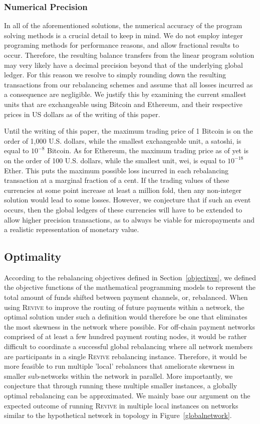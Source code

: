 \documentclass[sigconf]{acmart}
\newcommand{\name}{\textsc{Revive}\xspace}
\begin{document}
\subsubsection{Numerical Precision}

In all of the aforementioned solutions, the numerical accuracy of the program solving methods is a crucial detail to keep in mind. We do not employ integer programing methods for performance reasons, and allow fractional results to occur. Therefore, the resulting balance transfers from the linear program solution may very likely have a decimal precision beyond that of the underlying global ledger.
For this reason we resolve to simply rounding down the resulting transactions from our rebalancing schemes and assume that all losses incurred as a consequence are negligible. We justify this by examining the current smallest units that are exchangeable using Bitcoin and Ethereum, and their respective prices in US dollars as of the writing of this paper.

Until the writing of this paper, the maximum trading price of 1 Bitcoin is on the order of 1,000 U.S. dollars, while the smallest exchangeable unit, a satoshi, is equal to $10^{-8}$ Bitcoin. As for Ethereum, the maximum trading price as of yet is on the order of 100 U.S. dollars, while the smallest unit, wei, is equal to $10^{-18}$ Ether.
This puts the maximum possible loss incurred in each rebalancing transaction at a marginal fraction of a cent. If the trading values of these currencies at some point increase at least a million fold, then any non-integer solution would lead to some losses. However, we conjecture that if such an event occurs, then the global ledgers of these currencies will have to be extended to allow higher precision transactions, as to always be viable for micropayments and a realistic representation of monetary value.

\subsection{Optimality}
\label{optimality}
According to the rebalancing objectives defined in Section~\ref{objectives}, we defined the objective functions of the mathematical programming models to represent the total amount of funds shifted between payment channels, or, rebalanced. When using \name to improve the routing of future payments within a network, the optimal solution under such a definition would therefore be one that eliminates the most skewness in the network where possible.
For off-chain payment networks comprised of at least a few hundred payment routing nodes, it would be rather difficult to coordinate a successful global rebalancing where all network members are participants in a single \name rebalancing instance. Therefore, it would be more feasible to run multiple 'local' rebalances that ameliorate skewness in smaller sub-networks within the network in parallel.
More importantly, we conjecture that through running these multiple smaller instances, a globally optimal rebalancing can be approximated. We mainly base our argument on the expected outcome of running \name in multiple local instances on networks similar to the hypothetical network in topology in Figure~\ref{globalnetwork}.
\end{document}
